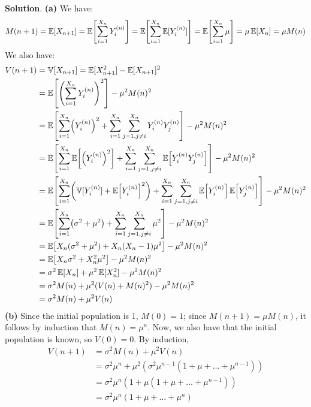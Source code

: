 \textbf{Solution}.
\textbf{(a)} We have:
\[
M(n + 1) = \EXP[X_{n + 1}] = \EXP\left[ \sum_{i = 1}^{X_{n}} Y_{i}^{(n)} \right] = \EXP\left[ \sum_{i = 1}^{X_{n}} \EXP[Y_{i}^{(n)}] \right] = \EXP\left[ \sum_{i = 1}^{X_{n}} \mu \right]  = \mu \EXP[X_{n}] = \mu M(n)
\]
We also have:
\begin{align*}
V(n + 1) &= \VAR[X_{n + 1}] = \EXP[X_{n + 1}^{2}] - \EXP[X_{n + 1}]^{2} \\
&= \EXP\left[\left( \sum_{i = 1}^{X_{n}} Y_{i}^{(n)} \right)^{2}\right] - \mu^{2} M(n)^{2} \\
&= \EXP\left[ \sum_{i = 1}^{X_{n}} \left( Y_{i}^{(n)} \right)^{2} + \sum_{i = 1}^{X_{n}} \sum_{j = 1, j \neq i}^{X_{n}} Y_{i}^{(n)} Y_{j}^{(n)} \right] - \mu^{2} M(n)^{2} \\
&= \EXP\left[ \sum_{i = 1}^{X_{n}} \EXP\left[\left( Y_{i}^{(n)} \right)^{2}\right] + \sum_{i = 1}^{X_{n}} \sum_{j = 1, j \neq i}^{X_{n}} \EXP\left[ Y_{i}^{(n)} Y_{j}^{(n)} \right] \right] - \mu^{2} M(n)^{2} \\
&= \EXP\left[ \sum_{i = 1}^{X_{n}} \left( \VAR[Y_{i}^{(n)}] +  \EXP\left[ Y_{i}^{(n)} \right]^{2} \right) + \sum_{i = 1}^{X_{n}} \sum_{j = 1, j \neq i}^{X_{n}} \EXP\left[ Y_{i}^{(n)} \right] \EXP \left[ Y_{j}^{(n)} \right] \right] - \mu^{2} M(n)^{2} \\
&= \EXP\left[ \sum_{i = 1}^{X_{n}} \left( \sigma^{2} + \mu^{2} \right) + \sum_{i = 1}^{X_{n}} \sum_{j = 1, j \neq i}^{X_{n}} \mu^{2} \right] - \mu^{2} M(n)^{2} \\
&= \EXP \left[ X_{n} (\sigma^{2} + \mu^{2}) + X_{n} (X_{n} - 1) \mu^{2} \right] - \mu^{2} M(n)^{2} \\
&= \EXP \left[ X_{n} \sigma^{2} + X_{n}^{2} \mu^{2} \right] - \mu^{2} M(n)^{2} \\
&= \sigma^{2} \EXP [ X_{n} ] + \mu^{2} \EXP [ X_{n}^{2} ] - \mu^{2} M(n)^{2} \\
&= \sigma^{2} M(n) + \mu^{2} (V(n) + M(n)^{2}) - \mu^{2} M(n)^{2} \\
&= \sigma^{2} M(n) + \mu^{2} V(n)
\end{align*}
\textbf{(b)}
Since the initial population is 1, \(M(0) = 1\); since
\(M(n + 1) = \mu M(n)\), it follows by induction that \(M(n) = \mu^{n}\).
Now, we also have that the initial population is known, so \(V(0) = 0\).
By induction,
\begin{align*}
V(n + 1) &= \sigma^{2} M(n) + \mu^{2} V(n) \\
&= \sigma^{2} \mu^{n} + \mu^{2} \left( \sigma^{2} \mu^{n - 1} \left( 1 + \mu + \dots + \mu^{n - 1}\right) \right) \\
&= \sigma^{2} \mu^{n} \left(1 + \mu \left( 1 + \mu + \dots + \mu^{n - 1} \right) \right) \\
&= \sigma^{2} \mu^{n} \left(1 + \mu + \dots + \mu^{n} \right)
\end{align*}
